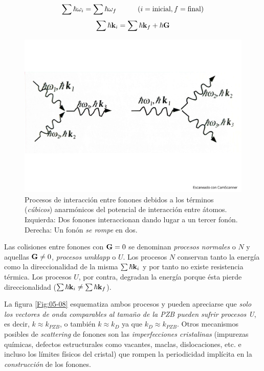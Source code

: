 \begin{equation*}
    \sum \hbar \omega_i = \sum \hbar \omega_f  \quad \quad \quad (i=\text{inicial}, f= \text{final})
\end{equation*}
\begin{equation}
    \sum \hbar \mathbf{k}_i = \sum \hbar \mathbf{k}_f + \hbar \mathbf{G}
\end{equation}

\begin{figure}[h!] \centering
    \includegraphics[scale=0.3]{Cuerpo/Ch_05/Fotos libro 7.pdf}
    \caption{Procesos de interacción entre fonones debidos a los términos (\textit{cúbicos}) anarmónicos del potencial de interacción entre átomos. Izquierda: Dos fonones interaccionan dando lugar a un tercer fonón. Derecha: Un fonón \textit{se rompe} en dos.}
    \label{Fig:05-07}
\end{figure}    

Las colisiones entre fonones con $\mathbf{G}=0$ se denominan \textit{procesos normales} o $N$ y aquellas $\mathbf{G}\neq 0$, \textit{procesos umklapp} o $U$. Los procesos $N$ conservan tanto la energía como la direccionalidad de la misma $\sum \hbar \mathbf{k}_i$ y por tanto no existe resistencia térmica. Los procesos $U$, por contra, degradan la energía porque ésta pierde direccionalidad ($\sum\hbar \mathbf{k}_i\neq \sum\hbar \mathbf{k}_f$). 

La figura \ref{Fig:05-08} esquematiza ambos procesos y pueden apreciarse que \textit{solo los vectores de onda comparables al tamaño de la PZB pueden sufrir procesos U}, es decir, $k\approx k_{PZB}$, o también $k\approx k_D$ ya que $k_D \approx k_{PZB}$. Otros mecanismos posibles de \textit{scattering} de fonones son las \textit{imperfecciones cristalinas} (impurezas químicas, defectos estructurales como vacantes, maclas, dislocaciones, etc. e incluso los límites físicos del cristal) que rompen la periodicidad implícita en la \textit{construcción} de los fonones.

